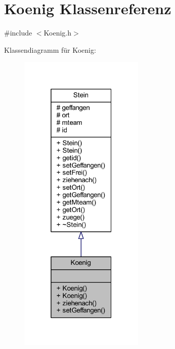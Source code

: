 \hypertarget{class_koenig}{}\section{Koenig Klassenreferenz}
\label{class_koenig}


{\ttfamily \#include $<$Koenig.\+h$>$}



Klassendiagramm für Koenig\+:\nopagebreak
\begin{figure}[H]
\begin{center}
\leavevmode
\includegraphics[width=169pt]{class_koenig__inherit__graph}
\end{center}
\end{figure}


